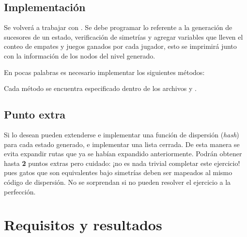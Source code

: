 \subsection{Implementaci\'on}

Se volverá a trabajar con .  Se debe programar lo referente a la generación de sucesores de un estado, verificación de simetrías y agregar variables que lleven el conteo de empates y juegos ganados por cada jugador, esto se imprimirá junto con la información de los nodos del nivel generado.

\noindent En pocas palabras es necesario implementar los siguientes métodos:

\begin{compactitem}
  \item {}
  \item {}
  \item {}
  \item {}
  \item {}
  \item {}
  \item {}
  \item {}
\end{compactitem}

\noindent Cada método se encuentra especificado dentro de los archivos  y .


\subsection{Punto extra}
Si lo desean pueden extenderse e implementar una función de dispersión (\textit{hash}) para cada estado generado, e implementar una lista cerrada. De esta manera se evita expandir rutas que ya se habían expandido anteriormente. Podrán obtener hasta \textbf{2} puntos extras pero cuidado: ¡no es nada trivial completar este ejercicio! pues gatos que son equivalentes bajo simetrías deben ser mapeados al mismo código de dispersión.  No se sorprendan si no pueden resolver el ejercicio a la perfección.


\section{Requisitos y resultados}

